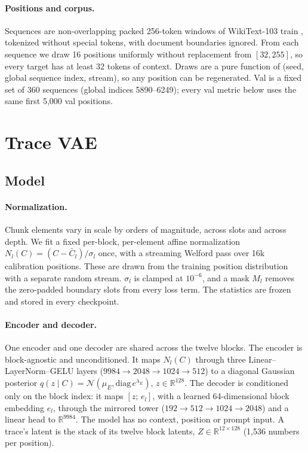\documentclass[11pt]{article}
\newcommand{\R}{\mathbb{R}}
\newcommand{\N}{\mathcal{N}}
\begin{document}
\paragraph{Positions and corpus.} Sequences are non-overlapping packed 256-token windows of WikiText-103 train
\citep{merity2016wikitext}, tokenized without special tokens, with document boundaries ignored. From each sequence we draw
16 positions uniformly without replacement from $[32, 255]$, so every target has at least 32 tokens of context. Draws are
a pure function of (seed, global sequence index, stream), so any position can be regenerated. Val is a fixed set of 360
sequences (global indices 5890--6249); every val metric below uses the same first 5{,}000 val positions.

\section{Trace VAE}
\label{sec:vae}

\subsection{Model}

\paragraph{Normalization.} Chunk elements vary in scale by orders of magnitude, across slots and across depth. We fit a
fixed per-block, per-element affine normalization $N_l(C) = (C - \bar C_l)/\sigma_l$ once, with a streaming
Welford pass over 16k calibration positions. These are drawn from the training position distribution with a separate
random stream. $\sigma_l$ is clamped at $10^{-6}$, and a mask $M_l$ removes the zero-padded boundary slots from every loss
term. The statistics are frozen and stored in every checkpoint.

\paragraph{Encoder and decoder.} One encoder and one decoder are shared across the twelve blocks. The encoder is
block-agnostic and unconditioned. It maps $N_l(C)$ through three Linear--LayerNorm--GELU layers ($9984 \to 2048 \to 1024
\to 512$) to a diagonal Gaussian posterior $q(z\mid C) = \N(\mu_E, \mathrm{diag}\,e^{\lambda_E})$, $z\in\R^{128}$. The
decoder is conditioned only on the block index: it maps $[z;\, e_l]$, with a learned 64-dimensional block embedding $e_l$,
through the mirrored tower ($192 \to 512 \to 1024 \to 2048$) and a linear head to $\R^{9984}$. The model has no context,
position or prompt input. A trace's latent is the stack of its twelve block latents, $Z \in \R^{12\times128}$ (1{,}536
numbers per position).
\end{document}
